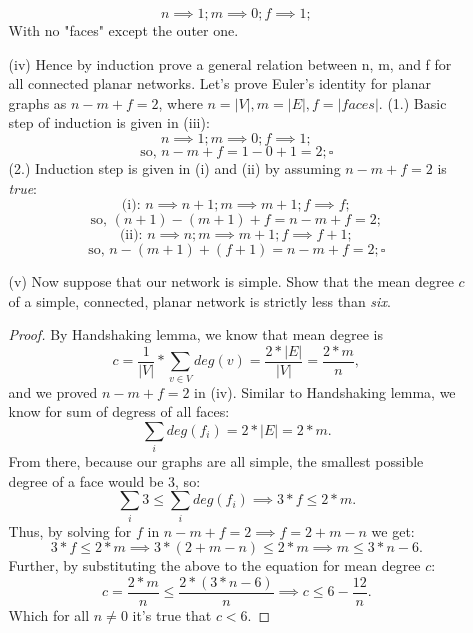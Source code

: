 \documentclass[12pt,a4paper,oneside,draft]{article}
\begin{document}
\begin{enumerate}
\begin{itemize}
        $$n \implies 1; m \implies 0; f \implies 1;$$
      With no "faces" except the outer one.
      \newline
      \newline
      \item [(iv) ] Hence by induction prove a general relation between n, m, and f for all
      connected planar networks.
      \newline
      \newline
      Let's prove Euler's identity for planar graphs as $n - m + f = 2$, where
      $n = |V|, m = |E|, f = |\textit{faces}|$.
      \newline
      (1.) Basic step of induction is given in (iii):
        $$n \implies 1; m \implies 0; f \implies 1;$$
        $$\text{so, } n - m + f = 1 - 0 + 1 = 2; \square$$
      \newline
      (2.) Induction step is given in (i) and (ii) by assuming $n - m + f = 2$ is \textit{true}:
        $$\text{(i): } n \implies n + 1; m \implies m + 1; f \implies f;$$
        $$\text{so, } (n + 1) - (m + 1) + f = n - m + f = 2;$$
        $$\text{(ii): } n \implies n; m \implies m + 1; f \implies f + 1;$$
        $$\text{so, } n - (m + 1) + (f + 1) = n - m + f = 2; \square$$
      \newline
      \item [(v) ] Now suppose that our network is simple. Show that the mean degree $c$ of a simple,
      connected, planar network is strictly less than \textit{six}.
      \newline
      \begin{proof}
        By Handshaking lemma, we know that mean degree is
          $$c = \frac{1}{|V|} * \sum_{v \in V} deg(v) = \frac{2 * |E|}{|V|} = \frac{2 * m}{n},$$
        and we proved $n - m + f = 2$ in (iv).
        \newline
        Similar to Handshaking lemma, we know for sum of degress of all faces:
          $$\sum_{i} deg(f_i) = 2 * |E| = 2 * m.$$
        From there, because our graphs are all simple, the smallest possible degree of a face
        would be $3$, so:
          $$\sum_{i} 3 \leq \sum_{i} deg(f_i) \implies 3 * f \leq 2 * m.$$
        Thus, by solving for $f$ in $n - m + f = 2 \implies f = 2 + m - n$ we get:
          $$3 * f \leq 2 * m \implies 3 * (2 + m - n) \leq 2 * m \implies m \leq 3*n - 6.$$
        Further, by substituting the above to the equation for mean degree $c$:
          $$c = \frac{2 * m}{n} \leq \frac{2*(3*n - 6)}{n} \implies c \leq 6 - \frac{12}{n}.$$
        Which for all $n \neq 0$ it's true that $c < 6.$

\end{proof}
\end{itemize}
\end{enumerate}
\end{document}
